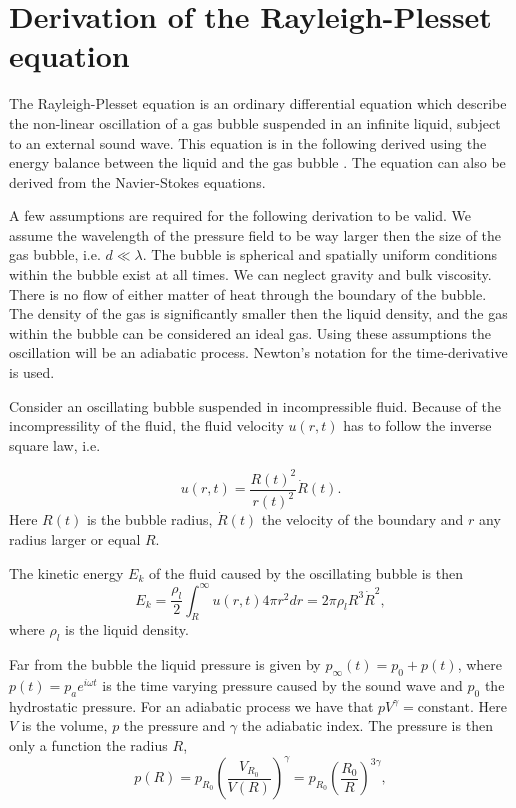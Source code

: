 \label{App:R-P}
\section{Derivation of the Rayleigh-Plesset equation}
The Rayleigh-Plesset equation is an ordinary differential equation which describe the non-linear oscillation of a gas bubble suspended in an infinite liquid, subject to an external sound wave. This equation is in the following derived using the energy balance between the liquid and the gas bubble \cite{Moss2014}. The equation can also be derived from the Navier-Stokes equations\cite{leighton2007derivation}.

A few assumptions are required for the following derivation to be valid. We assume the wavelength of the pressure field to be way larger then the size of the gas bubble, i.e. $d \ll \lambda$. The bubble is spherical and spatially uniform conditions within the bubble exist at all times. We can neglect gravity and bulk viscosity. There is no flow of either matter of heat through the boundary of the bubble. The density of the gas is significantly smaller then the liquid density, and the gas within the bubble can be considered an ideal gas. Using these assumptions the oscillation will be an adiabatic process.  Newton's notation for the time-derivative is used.

Consider an oscillating bubble suspended in incompressible fluid. Because of the incompressility of the fluid, the fluid velocity $u(r,t)$ has to follow the inverse square law, i.e. 

\begin{equation}
\label{eq:1}
u(r,t) = \frac{R(t)^2}{r(t)^2}\dot{R}(t).
\end{equation}
Here $R(t)$ is the bubble radius, $\dot{R}(t)$ the velocity of the boundary and $r$ any radius larger or equal $R$. 

The kinetic energy $E_k$ of the fluid caused by the oscillating bubble is then
\begin{equation}
\label{kinetic energy}
E_k = \frac{\rho_l}{2}\int_R^\infty u(r,t)4\pi r^2 dr = 2\pi\rho_l R^3 \dot{R}^2,
\end{equation}
where $\rho_l$ is the liquid density.

Far from the bubble the liquid pressure is given by $p_{\infty}(t) = p_0 + p(t)$, where $p(t) = p_a e^{i\omega t}$ is the time varying pressure caused by the sound wave and $p_0$ the hydrostatic pressure. For an adiabatic process we have that $pV^{\gamma}=\mathrm{constant}$. Here $V$ is the volume, $p$ the pressure and $\gamma$ the adiabatic index. The pressure is then only a function the radius $R$,
\begin{equation}
p(R) = p_{R_0}\left(\frac{V_{R_0}}{V(R)}\right)^{\gamma} =  p_{R_0}\left(\frac{R_0}{R}\right)^{3\gamma},
\end{equation}

